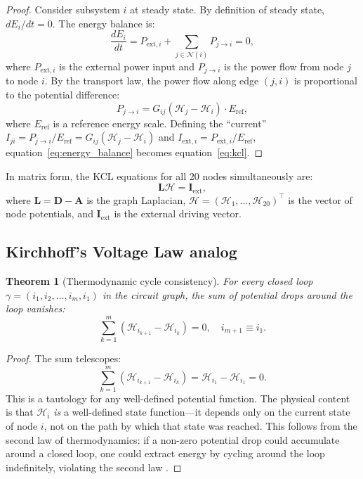 \documentclass[twocolumn,10pt,a4paper]{article}
\newtheorem{theorem}{Theorem}[section]
\theoremstyle{definition}
\theoremstyle{remark}
\newcommand{\Hcal}{\mathcal{H}}
\newcommand{\vect}[1]{\boldsymbol{#1}}
\newcommand{\mat}[1]{\mathbf{#1}}
\begin{document}
\begin{proof}
Consider subsystem $i$ at steady state. By definition of steady state, $dE_i/dt = 0$. The energy balance is:
\begin{equation}\label{eq:energy_balance}
    \frac{dE_i}{dt} = P_{\mathrm{ext},i} + \sum_{j \in \mathcal{N}(i)} P_{j \to i} = 0,
\end{equation}
where $P_{\mathrm{ext},i}$ is the external power input and $P_{j \to i}$ is the power flow from node $j$ to node $i$. By the transport law, the power flow along edge $(j, i)$ is proportional to the potential difference:
\begin{equation}\label{eq:power_flow}
    P_{j \to i} = G_{ij} (\Hcal_j - \Hcal_i) \cdot E_{\mathrm{ref}},
\end{equation}
where $E_{\mathrm{ref}}$ is a reference energy scale. Defining the ``current'' $I_{ji} = P_{j \to i} / E_{\mathrm{ref}} = G_{ij}(\Hcal_j - \Hcal_i)$ and $I_{\mathrm{ext},i} = P_{\mathrm{ext},i}/E_{\mathrm{ref}}$, equation~\eqref{eq:energy_balance} becomes equation~\eqref{eq:kcl}.
\end{proof}

In matrix form, the KCL equations for all 20 nodes simultaneously are:
\begin{equation}\label{eq:kcl_matrix}
    \mat{L} \vect{\Hcal} = \vect{I}_{\mathrm{ext}},
\end{equation}
where $\mat{L} = \mat{D} - \mat{A}$ is the graph Laplacian, $\vect{\Hcal} = (\Hcal_1, \ldots, \Hcal_{20})^\top$ is the vector of node potentials, and $\vect{I}_{\mathrm{ext}}$ is the external driving vector.

\subsection{Kirchhoff's Voltage Law analog}

\begin{theorem}[Thermodynamic cycle consistency]\label{thm:kvl}
For every closed loop $\gamma = (i_1, i_2, \ldots, i_m, i_1)$ in the circuit graph, the sum of potential drops around the loop vanishes:
\begin{equation}\label{eq:kvl}
    \sum_{k=1}^{m} (\Hcal_{i_{k+1}} - \Hcal_{i_k}) = 0, \quad i_{m+1} \equiv i_1.
\end{equation}
\end{theorem}

\begin{proof}
The sum telescopes:
\begin{equation}
    \sum_{k=1}^{m} (\Hcal_{i_{k+1}} - \Hcal_{i_k}) = \Hcal_{i_1} - \Hcal_{i_1} = 0.
\end{equation}
This is a tautology for any well-defined potential function. The physical content is that $\Hcal_i$ \emph{is} a well-defined state function---it depends only on the current state of node $i$, not on the path by which that state was reached. This follows from the second law of thermodynamics: if a non-zero potential drop could accumulate around a closed loop, one could extract energy by cycling around the loop indefinitely, violating the second law \citep{Callen1985}.
\end{proof}
\end{document}
